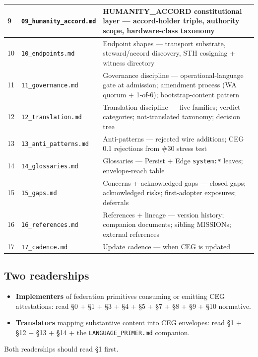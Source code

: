 \documentclass[10pt]{article}
\begin{document}
{\begin{longtable}{|p{5.33cm}|p{5.33cm}|p{5.33cm}|}
9 & \texttt{09\_humanity\_accord.md} & HUMANITY\_ACCORD constitutional layer — accord-holder triple, authority scope, hardware-class taxonomy \\ \hline
10 & \texttt{10\_endpoints.md} & Endpoint shapes — transport substrate, steward/accord discovery, STH cosigning + witness directory \\ \hline
11 & \texttt{11\_governance.md} & Governance discipline — operational-language gate at admission; amendment process (WA quorum + 1-of-6); bootstrap-content pattern \\ \hline
12 & \texttt{12\_translation.md} & Translation discipline — five families; verdict categories; not-translated taxonomy; decision tree \\ \hline
13 & \texttt{13\_anti\_patterns.md} & Anti-patterns — rejected wire additions; CEG 0.1 rejections from \#30 stress test \\ \hline
14 & \texttt{14\_glossaries.md} & Glossaries — Persist + Edge \texttt{system:*} leaves; envelope-reach table \\ \hline
15 & \texttt{15\_gaps.md} & Concerns + acknowledged gaps — closed gaps; acknowledged risks; first-adopter exposures; deferrals \\ \hline
16 & \texttt{16\_references.md} & References + lineage — version history; companion documents; sibling MISSIONs; external references \\ \hline
17 & \texttt{17\_cadence.md} & Update cadence — when CEG is updated \\ \hline
\end{longtable}}



\subsection*{Two readerships}


\begin{itemize}\setlength\itemsep{0pt}
\item \textbf{Implementers} of federation primitives consuming or emitting CEG attestations: read §0 + §1 + §3 + §4 + §5 + §7 + §8 + §9 + §10 normative.
\item \textbf{Translators} mapping substantive content into CEG envelopes: read §1 + §12 + §13 + §14 + the \texttt{LANGUAGE\_PRIMER.md} companion.
\end{itemize}


Both readerships should read §1 first.


\clearpage
\end{document}
